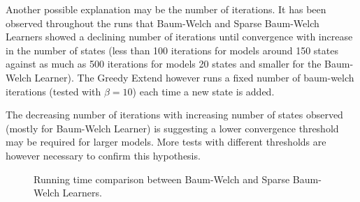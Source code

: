 Another possible explanation may be the number of iterations. It has been observed throughout the runs that Baum-Welch and Sparse Baum-Welch Learners showed a declining number of iterations until convergence with increase in the number of states (less than 100 iterations for models around 150 states against as much as 500 iterations for models 20 states and smaller for the Baum-Welch Learner). The Greedy Extend however runs a fixed number of \gls{baum-welch} iterations (tested with $\beta = 10$) each time a new state is added.

The decreasing number of iterations with increasing number of states observed (mostly for Baum-Welch Learner) is suggesting a lower convergence threshold may be required for larger models. More tests with different thresholds are however necessary to confirm this hypothesis.

\begin{figure}
	\centering
	
	
	\caption{Running time comparison between Baum-Welch and Sparse Baum-Welch Learners.}
	\label{fig:bw_vs_sbw}
\end{figure}

